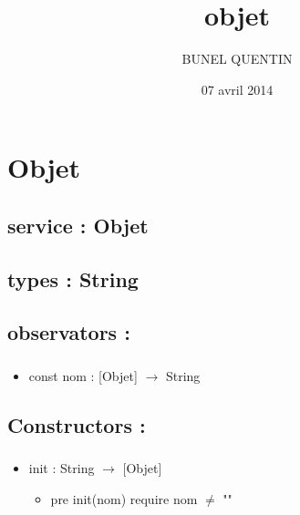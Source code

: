 \documentclass[11pt]{article}
\title{objet}
\author{BUNEL QUENTIN}
\date{07 avril 2014}
\begin{document}
\maketitle

\setcounter{tocdepth}{3}
\tableofcontents
\vspace*{1cm}
\section{Objet}
\label{sec-1}

\subsection{service : Objet}
\label{sec-1.1}

\subsection{types : String}
\label{sec-1.2}



\subsection{observators :}
\label{sec-1.3}

\subsubsection{}

\begin{itemize}

\item const nom : [Objet] $\to$ String\\
\label{sec-1.3.1.1}



\end{itemize} %
\subsection{Constructors :}
\label{sec-1.4}

\subsubsection{}

\begin{itemize}

\item init : String $\to$ [Objet]\\
\label{sec-1.4.1.1}

\begin{itemize}

\item pre init(nom) require nom $\neq$ ""\\
\label{sec-1.4.1.1.1}



\end{itemize} %
\end{itemize} %
\end{document}
